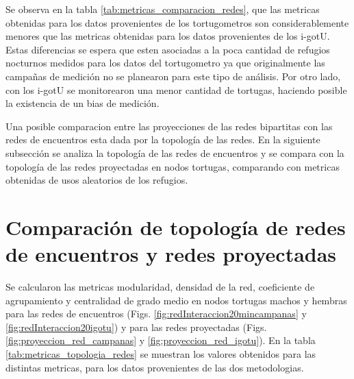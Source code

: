 Se observa en la tabla \ref{tab:metricas_comparacion_redes}, que las metricas obtenidas para los datos provenientes de los tortugometros son considerablemente menores que las metricas obtenidas para los datos provenientes de los i-gotU. Estas diferencias se espera que esten asociadas a la poca cantidad de refugios nocturnos medidos para los datos del tortugometro ya que originalmente las campañas de medición no se planearon para este tipo de análisis. Por otro lado, con los i-gotU se monitorearon una menor cantidad de tortugas, haciendo posible la existencia de un bias de medición. 

Una posible comparacion entre las proyecciones de las redes bipartitas con las redes de encuentros esta dada por la topología de las redes.  En la siguiente subsección se analiza la topología de las redes de encuentros y se compara con la topología de las redes proyectadas en nodos tortugas, comparando con metricas obtenidas de usos aleatorios de los refugios. 
\section{Comparación de topología de redes de encuentros y redes proyectadas}
Se calcularon las metricas modularidad, densidad de la red, coeficiente de agrupamiento y centralidad de grado medio en nodos tortugas machos y hembras para las redes de encuentros (Figs. \ref{fig:redInteraccion20mincampanas} y \ref{fig:redInteraccion20igotu}) y para las redes proyectadas (Figs. \ref{fig:proyeccion_red_campanas} y \ref{fig:proyeccion_red_igotu}). En la tabla \ref{tab:metricas_topologia_redes}   se muestran los valores obtenidos para las distintas metricas, para los datos provenientes de las dos metodologias.



